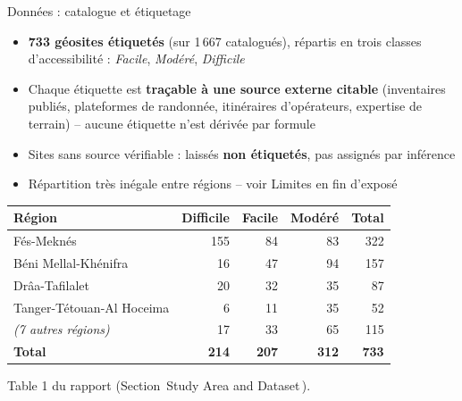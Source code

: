\documentclass[11pt,aspectratio=169]{beamer}
\newcommand{\source}[1]{{\tiny\color{graytext}#1}}
\begin{document}
\begin{frame}{Donn\'ees : catalogue et \'etiquetage}
  \footnotesize
  \begin{itemize}
    \setlength\itemsep{0.4em}
    \item \textbf{733 g\'eosites \'etiquet\'es} (sur 1\,667 catalogu\'es), r\'epartis en
      trois classes d'accessibilit\'e : \emph{Facile}, \emph{Mod\'er\'e}, \emph{Difficile}
    \item Chaque \'etiquette est \textbf{tra\c{c}able \`a une source externe citable}
      (inventaires publi\'es, plateformes de randonn\'ee, itin\'eraires d'op\'erateurs,
      expertise de terrain) -- aucune \'etiquette n'est d\'eriv\'ee par formule
    \item Sites sans source v\'erifiable : laiss\'es \textbf{non \'etiquet\'es}, pas
      assign\'es par inf\'erence
    \item R\'epartition tr\`es in\'egale entre r\'egions -- voir Limites en fin d'expos\'e
  \end{itemize}
  \vspace{0.2cm}
  \centering\footnotesize
  \begin{tabular}{@{}>{\raggedright\arraybackslash}p{4.4cm}rrrr@{}}
    \toprule
    R\'egion & Difficile & Facile & Mod\'er\'e & Total \\
    \midrule
    F\'es-Mekn\'es & 155 & 84 & 83 & 322 \\
    B\'eni Mellal-Kh\'enifra & 16 & 47 & 94 & 157 \\
    Dr\^aa-Tafilalet & 20 & 32 & 35 & 87 \\
    Tanger-T\'etouan-Al Hoceima & 6 & 11 & 35 & 52 \\
    \emph{(7 autres r\'egions)} & 17 & 33 & 65 & 115 \\
    \midrule
    \textbf{Total} & \textbf{214} & \textbf{207} & \textbf{312} & \textbf{733} \\
    \bottomrule
  \end{tabular}
  \vfill
  \source{Table 1 du rapport (Section \guillemotleft\,Study Area and Dataset\,\guillemotright).}
\end{frame}
\end{document}
